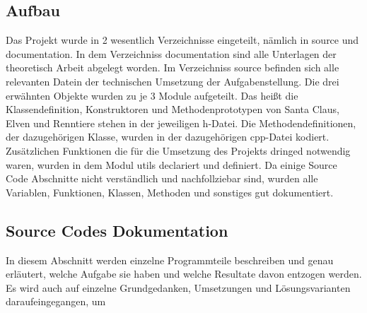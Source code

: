 \documentclass[a4paper,12pt]{article}
\begin{document}
\subsection{Aufbau}
Das Projekt wurde in 2 wesentlich Verzeichnisse eingeteilt, nämlich in source und documentation. In dem Verzeichniss documentation sind alle Unterlagen der theoretisch Arbeit 
abgelegt worden. Im Verzeichniss source befinden sich alle relevanten Datein der technischen Umsetzung der Aufgabenstellung.
Die drei erwähnten Objekte wurden zu je 3 Module aufgeteilt.
Das heißt die Klassendefinition, Konstruktoren und Methodenprototypen von Santa Claus, Elven und Renntiere stehen in der jeweiligen h-Datei. Die Methodendefinitionen, der dazugehörigen Klasse,
wurden in der dazugehörigen cpp-Datei kodiert. Zusätzlichen Funktionen die für die Umsetzung des Projekts dringed notwendig waren, wurden in dem Modul utils declariert und definiert.
Da einige Source Code Abschnitte nicht verständlich und nachfollziebar sind, wurden alle Variablen, Funktionen, Klassen, Methoden und sonstiges gut dokumentiert.\\
\subsection{Source Codes Dokumentation}
In diesem Abschnitt werden einzelne Programmteile beschreiben und genau erläutert, welche Aufgabe sie haben und welche Resultate davon entzogen werden.
Es wird auch auf einzelne Grundgedanken, Umsetzungen und Lösungsvarianten daraufeingegangen, um 
\end{document}
